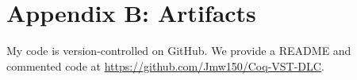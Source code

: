 \section{Appendix B: Artifacts}
My code is version-controlled on GitHub. We provide a README and commented code 
at \url{https://github.com/Jmw150/Coq-VST-DLC}.